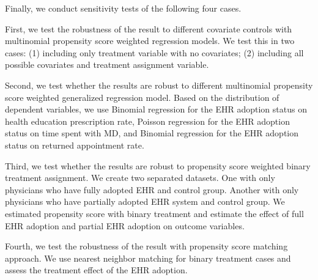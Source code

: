Finally, we conduct sensitivity tests of the following four cases.

First, we test the robustness of the result to different covariate controls with multinomial propensity score weighted regression models. We test this in two cases: (1) including only treatment variable with no covariates; (2) including all possible covariates and treatment assignment variable.

Second, we test whether the results are robust to different multinomial propensity score weighted generalized regression model. Based on the distribution of dependent variables, we use Binomial regression for the EHR adoption status on health education prescription rate, Poisson regression for the EHR adoption status on time spent with MD, and Binomial regression for the EHR adoption status on returned appointment rate.

Third, we test whether the results are robust to propensity score weighted binary treatment assignment. We create two separated datasets. One with only physicians who have fully adopted EHR and control group. Another with only physicians who have partially adopted EHR system and control group. We estimated propensity score with binary treatment and estimate the effect of full EHR adoption and partial EHR adoption on outcome variables.

Fourth, we test the robustness of the result with propensity score matching approach. We use nearest neighbor matching for binary treatment cases and assess the treatment effect of the EHR adoption.

